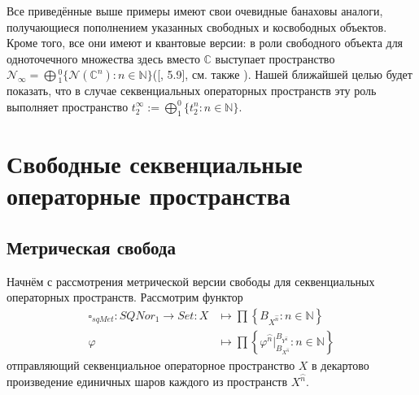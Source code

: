 \documentclass[12pt]{article}
\begin{document}
Все приведённые выше примеры имеют свои очевидные банаховы аналоги, получающиеся пополнением указанных свободных и косвободных объектов. Кроме того, все они имеют и квантовые версии: в роли свободного 
объекта для одноточечного множества здесь вместо $\mathbb{C}$ выступает пространство $\mathcal{N}_{\infty} =  \bigoplus{}_1^0\{\mathcal{N}(\mathbb{C}^n):n\in\mathbb{N}\}$([\cite{HelMetrFrQmod}, 5.9], 
см. также \cite{ShtTopFr}). Нашей ближайшей целью будет показать, что в случае секвенциальных операторных пространств эту роль выполняет пространство $t_2^{\infty} :=  \bigoplus_1^0\{t_2^n:n\in\mathbb{N}\}$.  






































\section{Свободные секвенциальные операторные пространства}

\subsection{Метрическая свобода}

Начнём с рассмотрения метрической версии свободы для секвенциальных операторных пространств. Рассмотрим функтор 
$$
\begin{aligned}
\square_{sqMet} : SQNor_1 \to Set : X&\mapsto\prod\left\{ B_{X^{\wideparen{n}}}:n \in \mathbb{N}\right\}\\
\varphi&\mapsto \prod\left\{\varphi^{\wideparen{n}}|_{B_{X^{\wideparen{n}}}}^{B_{Y^{\wideparen{n}}}}:n\in\mathbb{N}\right\}
\end{aligned}
$$
отправляющий  секвенциальное операторное пространство $X$ в декартово произведение единичных шаров каждого из пространств $X^{\wideparen{n}}$. 
\end{document}
